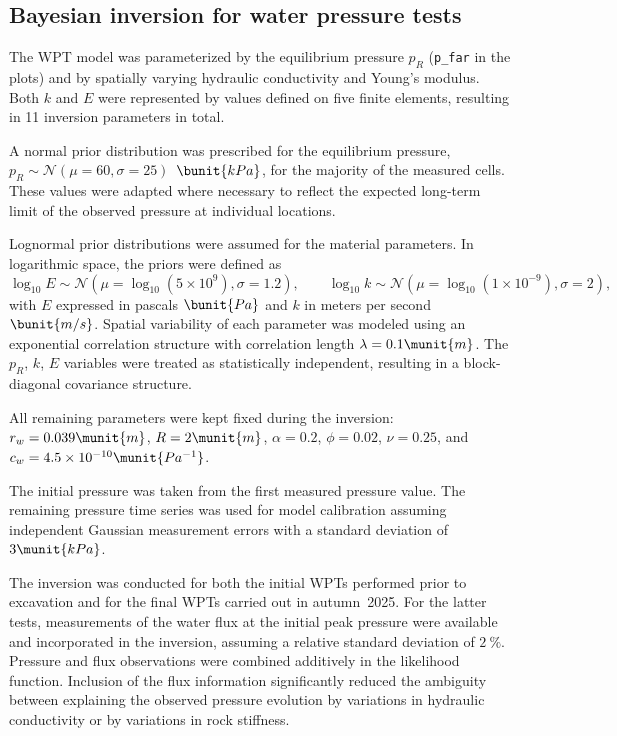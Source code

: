 \subsection{Bayesian inversion for water pressure tests}

The WPT model was parameterized by the equilibrium pressure $p_R$
(\verb|p_far| in the plots) and by spatially varying hydraulic conductivity
and Young’s modulus. Both $k$ and $E$ were represented by values defined on
five finite elements, resulting in 11 inversion parameters in total.

A normal prior distribution was prescribed for the equilibrium pressure,
$p_R \sim \mathcal{N}(\mu = 60,\sigma = 25)$~$\bunit{kPa}$, for the majority of the
measured cells. These values were adapted where necessary to reflect the expected long-term  limit of the observed pressure at individual locations.

Lognormal prior distributions were assumed for the material parameters. In
logarithmic space, the priors were defined as
\[
\log_{10} E \sim \mathcal{N}\!\left(\mu = \log_{10}(5\times10^{9}),
\sigma = 1.2\right), \qquad
\log_{10} k \sim \mathcal{N}\!\left(\mu = \log_{10}(1\times10^{-9}),
\sigma = 2\right),
\]
with $E$ expressed in pascals $\bunit{Pa}$ and $k$ in meters per second $\bunit{m/s}$.
Spatial variability of each parameter was modeled using an exponential
correlation structure with correlation length $\lambda = 0.1 \munit{m}$. The
$p_R$, $k$, $E$ variables were treated as
statistically independent, resulting in a block-diagonal covariance
structure.

All remaining parameters were kept fixed during the inversion:
$r_w = 0.039 \munit{m}$, $R = 2 \munit{m}$, $\alpha = 0.2$, $\phi = 0.02$, $\nu = 0.25$, and
$c_w = 4.5\times10^{-10} \munit{Pa^{-1}}$.

The initial pressure was taken from the first measured pressure value. The
remaining pressure time series was used for model calibration assuming
independent Gaussian measurement errors with a standard deviation of
$3 \munit{kPa}$. 

The inversion was conducted for both the initial WPTs performed prior to
excavation and for the final WPTs carried out in autumn~2025. For the latter
tests, measurements of the water flux at the initial peak pressure were
available and incorporated in the inversion, assuming a relative standard
deviation of $2~\%$. Pressure and flux observations were combined additively in the
likelihood function. Inclusion of the flux information significantly reduced
the ambiguity between explaining the observed pressure evolution by
variations in hydraulic conductivity or by variations in rock stiffness.

